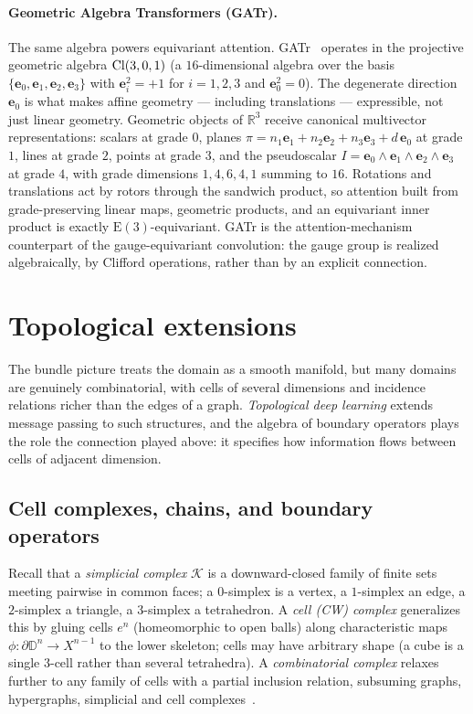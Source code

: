 \paragraph{Geometric Algebra Transformers (GATr).}
The same algebra powers equivariant attention. GATr~\citep{brehmer2023geometric}
operates in the projective geometric algebra $\operatorname{Cl}(3,0,1)$ (a $16$-dimensional
algebra over the basis $\{\mathbf{e}_0, \mathbf{e}_1, \mathbf{e}_2,
\mathbf{e}_3\}$ with $\mathbf{e}_i^2 = +1$ for $i = 1,2,3$ and $\mathbf{e}_0^2 =
0$). The degenerate direction $\mathbf{e}_0$ is what makes affine geometry ---
including translations --- expressible, not just linear geometry. Geometric
objects of $\mathbb{R}^3$ receive canonical multivector representations: scalars
at grade $0$, planes $\pi = n_1\mathbf{e}_1 + n_2\mathbf{e}_2 + n_3\mathbf{e}_3 +
d\,\mathbf{e}_0$ at grade $1$, lines at grade $2$, points at grade $3$, and the
pseudoscalar $I = \mathbf{e}_0\wedge\mathbf{e}_1\wedge\mathbf{e}_2\wedge
\mathbf{e}_3$ at grade $4$, with grade dimensions $1, 4, 6, 4, 1$ summing to
$16$. Rotations and translations act by rotors through the sandwich product, so
attention built from grade-preserving linear maps, geometric products, and an
equivariant inner product is exactly $\mathrm{E}(3)$-equivariant. GATr is the
attention-mechanism counterpart of the gauge-equivariant convolution: the gauge
group is realized algebraically, by Clifford operations, rather than by an
explicit connection.

\section{Topological extensions}
\label{sec:gauge:topology}

The bundle picture treats the domain as a smooth manifold, but many domains are
genuinely combinatorial, with cells of several dimensions and incidence relations
richer than the edges of a graph. \emph{Topological deep learning} extends
message passing to such structures, and the algebra of boundary operators plays
the role the connection played above: it specifies how information flows between
cells of adjacent dimension.

\subsection{Cell complexes, chains, and boundary operators}
\label{sec:gauge:chains}

Recall that a \emph{simplicial complex} $\mathcal{K}$ is a downward-closed family
of finite sets meeting pairwise in common faces; a $0$-simplex is a vertex, a
$1$-simplex an edge, a $2$-simplex a triangle, a $3$-simplex a tetrahedron. A
\emph{cell (CW) complex} generalizes this by gluing cells $e^n$ (homeomorphic to
open balls) along characteristic maps $\phi\colon \partial\mathbb{D}^n \to
X^{n-1}$ to the lower skeleton; cells may have arbitrary shape (a cube is a single
$3$-cell rather than several tetrahedra). A \emph{combinatorial complex} relaxes
further to any family of cells with a partial inclusion relation, subsuming
graphs, hypergraphs, simplicial and cell complexes~\citep{hajij2023topological}.

